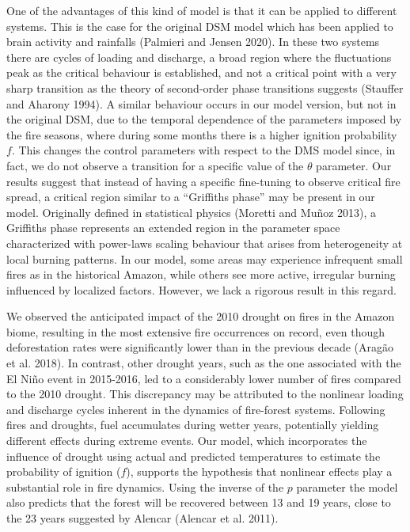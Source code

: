 \documentclass[
]{article}
\begin{document}
One of the advantages of this kind of model is that it can be applied to
different systems. This is the case for the original DSM model which has
been applied to brain activity and rainfalls (Palmieri and Jensen 2020).
In these two systems there are cycles of loading and discharge, a broad
region where the fluctuations peak as the critical behaviour is
established, and not a critical point with a very sharp transition as
the theory of second-order phase transitions suggests (Stauffer and
Aharony 1994). A similar behaviour occurs in our model version, but not
in the original DSM, due to the temporal dependence of the parameters
imposed by the fire seasons, where during some months there is a higher
ignition probability \(f\). This changes the control parameters with
respect to the DMS model since, in fact, we do not observe a transition
for a specific value of the \(\theta\) parameter. Our results suggest
that instead of having a specific fine-tuning to observe critical fire
spread, a critical region similar to a ``Griffiths phase'' may be
present in our model. Originally defined in statistical physics (Moretti
and Muñoz 2013), a Griffiths phase represents an extended region in the
parameter space characterized with power-laws scaling behaviour that
arises from heterogeneity at local burning patterns. In our model, some
areas may experience infrequent small fires as in the historical Amazon,
while others see more active, irregular burning influenced by localized
factors. However, we lack a rigorous result in this regard.

We observed the anticipated impact of the 2010 drought on fires in the
Amazon biome, resulting in the most extensive fire occurrences on
record, even though deforestation rates were significantly lower than in
the previous decade (Aragão et al. 2018). In contrast, other drought
years, such as the one associated with the El Niño event in 2015-2016,
led to a considerably lower number of fires compared to the 2010
drought. This discrepancy may be attributed to the nonlinear loading and
discharge cycles inherent in the dynamics of fire-forest systems.
Following fires and droughts, fuel accumulates during wetter years,
potentially yielding different effects during extreme events. Our model,
which incorporates the influence of drought using actual and predicted
temperatures to estimate the probability of ignition (\(f\)), supports
the hypothesis that nonlinear effects play a substantial role in fire
dynamics. Using the inverse of the \(p\) parameter the model also
predicts that the forest will be recovered between 13 and 19 years,
close to the 23 years suggested by Alencar (Alencar et al. 2011).
\end{document}

